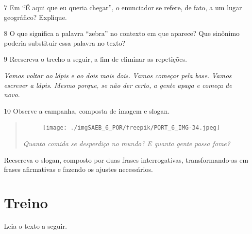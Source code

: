 
\num{7} Em ``É aqui que eu queria chegar'', o enunciador se refere, de
fato, a um lugar geográfico? Explique.


\num{8} O que significa a palavra ``zebra'' no contexto em que aparece?
Que sinônimo poderia substituir essa palavra no texto?


\num{9} Reescreva o trecho a seguir, a fim de eliminar as repetições.

\smallskip

\noindent\small\emph{Vamos voltar ao lápis e ao dois mais dois. Vamos começar pela base.
Vamos escrever a lápis. Mesmo porque, se não der certo, a gente apaga e
começa de novo.}

\normalsize


\num{10} Observe a campanha, composta de imagem e slogan.

\begin{quote}
\begin{figure}[H]
\centering\texttt{[image: ./imgSAEB\_6\_POR/freepik/PORT\_6\_IMG-34.jpeg]}
\end{figure}

\centering\emph{Quanta comida se desperdiça no mundo? E quanta gente passa fome?}
\end{quote}

\noindent Reescreva o slogan, composto por duas frases interrogativas,
transformando-as em frases afirmativas e fazendo os ajustes necessários.


\section*{Treino}

Leia o texto a seguir.

